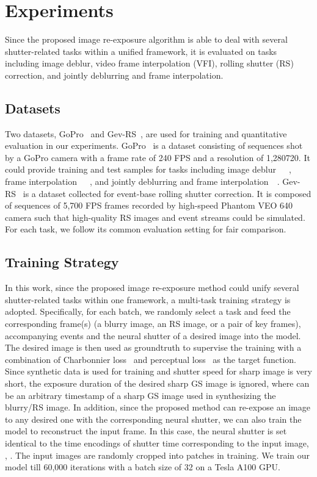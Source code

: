 \documentclass[10pt,twocolumn,letterpaper]{article}
\begin{document}
 
\section{Experiments}

Since the proposed image re-exposure algorithm is able to deal with several shutter-related tasks within a unified framework, it is evaluated on tasks including image deblur, video frame interpolation (VFI), rolling shutter (RS) correction, and jointly deblurring and frame interpolation.

\subsection{Datasets}
Two datasets, GoPro~\cite{GoProDataset} and Gev-RS~\cite{EvUnroll}, are used for training and quantitative evaluation in our experiments. 
GoPro~\cite{GoProDataset} is a dataset consisting of sequences shot by a GoPro camera with a frame rate of 240 FPS and a resolution of 1,280720. 
It could provide training and test samples for tasks including image deblur~\cite{EFNet}~\cite{DeblurGAN}~\cite{SRN}, frame interpolation~\cite{TimeLens}~\cite{DAIN}~\cite{SloMo}, and jointly deblurring and frame interpolation~\cite{DeMFI}~\cite{TNTT}.
Gev-RS~\cite{EvUnroll} is a dataset collected for event-base rolling shutter correction. It is composed of sequences of 5,700 FPS frames recorded by high-speed Phantom VEO 640 camera such that high-quality RS images and event streams could be simulated. 
For each task, we follow its common evaluation setting for fair comparison.

\subsection{Training Strategy}
In this work, since the proposed image re-exposure method could unify several shutter-related tasks within one framework, a multi-task training strategy is adopted.
Specifically, for each batch, we randomly select a task and feed the corresponding frame(s) (\eg a blurry image, an RS image, or a pair of key frames), accompanying events and the neural shutter of a desired image into the model. The desired image is then used as groundtruth to supervise the training with a combination of Charbonnier loss~\cite{CharbonnierLoss} and perceptual loss~\cite{PerceptualLoss} 
as the target function. 
Since synthetic data is used for training and shutter speed for sharp image is very short, the exposure duration of the desired sharp GS image is ignored, \ie  where  can be an arbitrary timestamp of a sharp GS image used in synthesizing the blurry/RS image. 
In addition, since the proposed method can re-expose an image to any desired one with the corresponding neural shutter, we can also train the model to reconstruct the input frame.
In this case, the neural shutter is set identical to the time encodings of shutter time corresponding to the input image, \ie, .
The input images are randomly cropped into  patches in training. We train our model till 60,000 iterations with a batch size of 32 on a Tesla A100 GPU.
\end{document}
